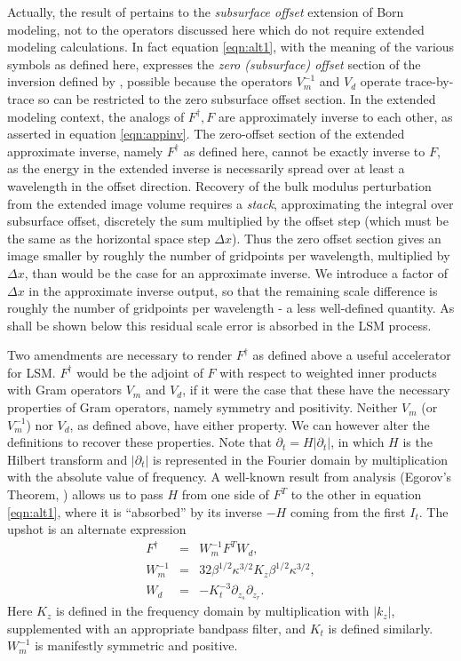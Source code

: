 Actually, the result of \cite{HouSymes:17} pertains to the {\em
  subsurface offset} extension of Born modeling, not to the operators
discussed here which do not require extended modeling calculations. In
fact equation \ref{eqn:alt1}, with the meaning of the various symbols
as defined here, expresses the {\em zero (subsurface) offset} section
of the inversion defined by \cite{HouSymes:17}, possible because the
operators $V_m^{-1}$ and $V_d$ operate trace-by-trace so can be
restricted to the zero subsurface offset section. In the extended
modeling context, the analogs of $F^{\dagger},F$ are approximately
inverse to each other, as asserted in equation \ref{eqn:appinv}. The
zero-offset section of the extended approximate inverse, namely
$F^{\dagger}$ as defined here, cannot be exactly inverse to $F$, as
the energy in the extended inverse is necessarily spread over at least
a wavelength in the offset direction. Recovery of the bulk modulus
perturbation from the extended image volume requires a {\em stack},
approximating the integral over subsurface offset, discretely
the sum multiplied by the offset step (which must be the same as the
horizontal space step $\Delta x$). Thus the zero offset section gives
an image smaller by roughly the number of gridpoints per wavelength,
multiplied by $\Delta x$, than would be the case for an approximate
inverse. We introduce a factor of $\Delta x$ in the approximate
inverse output, so that the remaining scale difference is roughly the
number of gridpoints per wavelength - a less well-defined quantity. As
shall be shown below this residual scale error is absorbed in the LSM
process.

Two amendments are necessary to render $F^{\dagger}$ as defined above
a useful accelerator for LSM.
$F^{\dagger}$ would be the adjoint of $F$ with respect to weighted inner
products with Gram operators $V_m$ and $V_d$, if it were the case that these have
the necessary properties of Gram operators, namely symmetry and
positivity. Neither $V_m$ (or $V_m^{-1}$) nor $V_d$, as defined above,
have either property. We can however alter the definitions to recover
these properties. Note that $\partial_t = H |\partial_t|$, in which
$H$ is the Hilbert transform and $|\partial_t|$ is represented in the
Fourier domain by multiplication with
the absolute value of frequency. A well-known result from analysis
(Egorov's Theorem, \cite{Tay:81}) allows us to pass $H$ from one
side of $F^T$ to the other in equation \ref{eqn:alt1}, where it is
``absorbed'' by its inverse $-H$ coming from the first $I_t$. The
upshot is an alternate expression 
\begin{eqnarray}
\label{eqn:alt2}
F^{\dagger} & = & W_m^{-1}F^TW_d, \nonumber \\
 W_m^{-1}&=&32\beta^{1/2} \kappa^{3/2} K_z \beta^{1/2}
             \kappa^{3/2},\nonumber \\
W_d &=& -K_t^{-3} \partial_{z_s}\partial_{z_r}.
\end{eqnarray}
Here $K_z$ is defined in the frequency domain by multiplication with
$|k_z|$, supplemented with an appropriate bandpass filter, and $K_t$
is defined similarly. $W_m^{-1}$ is manifestly symmetric and positive.

